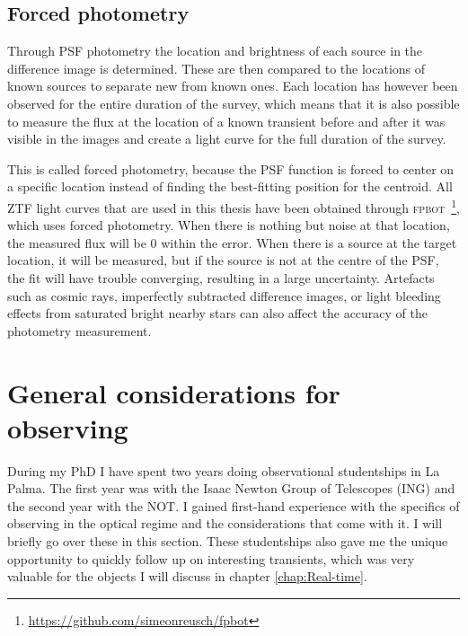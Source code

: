 \documentclass[a4paper,oneside,12pt, class=Latex/Classes/PhDthesisPSnPDF, crop=false]{standalone}
\begin{document}
\subsection{Forced photometry}
Through PSF photometry the location and brightness of each source in the difference image is determined. These are then compared to the locations of known sources to separate new from known ones. Each location has however been observed for the entire duration of the survey, which means that it is also possible to measure the flux at the location of a known transient before and after it was visible in the images and create a light curve for the full duration of the survey.

This is called forced photometry, because the PSF function is forced to center on a specific location instead of finding the best-fitting position for the centroid. All ZTF light curves that are used in this thesis have been obtained through \textsc{fpbot} \citep{fpbot}\,\footnote{\url{https://github.com/simeonreusch/fpbot}}, which uses forced photometry. When there is nothing but noise at that location, the measured flux will be 0 within the error. When there is a source at the target location, it will be measured, but if the source is not at the centre of the PSF, the fit will have trouble converging, resulting in a large uncertainty. Artefacts such as cosmic rays, imperfectly subtracted difference images, or light bleeding effects from saturated bright nearby stars can also affect the accuracy of the photometry measurement.


\section{General considerations for observing}
\label{considerations}
During my PhD I have spent two years doing observational studentships in La Palma. The first year was with the Isaac Newton Group of Telescopes (ING) and the second year with the NOT. I gained first-hand experience with the specifics of observing in the optical regime and the considerations that come with it. I will briefly go over these in this section. These studentships also gave me the unique opportunity to quickly follow up on interesting transients, which was very valuable for the objects I will discuss in chapter \ref{chap:Real-time}.
\end{document}
